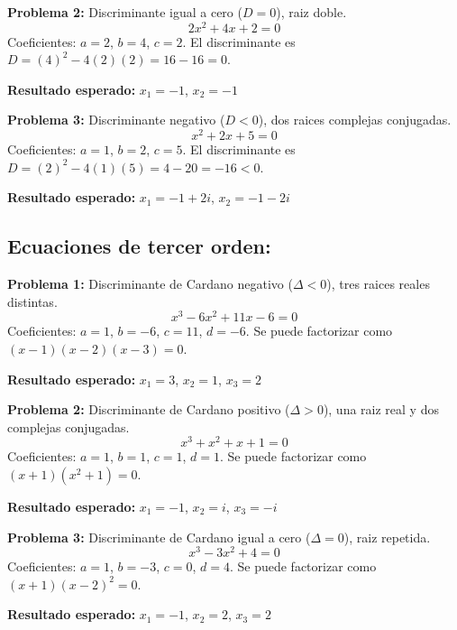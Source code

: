 \documentclass[letterpaper,12pt]{article}
\begin{document}
    \textbf{Problema 2:} Discriminante igual a cero ($D = 0$), raiz doble.
    \begin{equation}
        2x^2 + 4x + 2 = 0
    \end{equation}
    Coeficientes: $a = 2$, $b = 4$, $c = 2$. El discriminante es $D = (4)^2 - 4(2)(2) = 16 - 16 = 0$.
    \begin{center}
        \textbf{Resultado esperado:} $x_1 = -1$, \quad $x_2 = -1$
    \end{center}

    \textbf{Problema 3:} Discriminante negativo ($D < 0$), dos raices complejas conjugadas.
    \begin{equation}
        x^2 + 2x + 5 = 0
    \end{equation}
    Coeficientes: $a = 1$, $b = 2$, $c = 5$. El discriminante es $D = (2)^2 - 4(1)(5) = 4 - 20 = -16 < 0$.
    \begin{center}
        \textbf{Resultado esperado:} $x_1 = -1 + 2i$, \quad $x_2 = -1 - 2i$
    \end{center}

    \subsection{Ecuaciones de tercer orden:}

    \textbf{Problema 1:} Discriminante de Cardano negativo ($\Delta < 0$), tres raices reales distintas.
    \begin{equation}
        x^3 - 6x^2 + 11x - 6 = 0
    \end{equation}
    Coeficientes: $a = 1$, $b = -6$, $c = 11$, $d = -6$. Se puede factorizar como $(x-1)(x-2)(x-3) = 0$.
    \begin{center}
        \textbf{Resultado esperado:} $x_1 = 3$, \quad $x_2 = 1$, \quad $x_3 = 2$
    \end{center}

    \textbf{Problema 2:} Discriminante de Cardano positivo ($\Delta > 0$), una raiz real y dos complejas conjugadas.
    \begin{equation}
        x^3 + x^2 + x + 1 = 0
    \end{equation}
    Coeficientes: $a = 1$, $b = 1$, $c = 1$, $d = 1$. Se puede factorizar como $(x+1)(x^2+1) = 0$.
    \begin{center}
        \textbf{Resultado esperado:} $x_1 = -1$, \quad $x_2 = i$, \quad $x_3 = -i$
    \end{center}

    \textbf{Problema 3:} Discriminante de Cardano igual a cero ($\Delta = 0$), raiz repetida.
    \begin{equation}
        x^3 - 3x^2 + 4 = 0
    \end{equation}
    Coeficientes: $a = 1$, $b = -3$, $c = 0$, $d = 4$. Se puede factorizar como $(x+1)(x-2)^2 = 0$.
    \begin{center}
        \textbf{Resultado esperado:} $x_1 = -1$, \quad $x_2 = 2$, \quad $x_3 = 2$
    \end{center}
\end{document}

